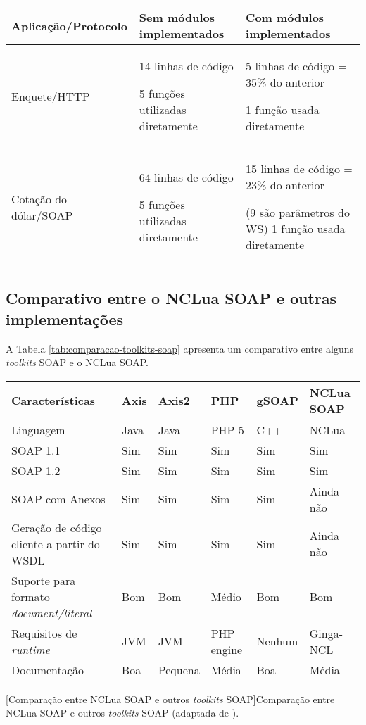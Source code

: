\begin{center}
\scriptsize{
	\begin{tabular}{|p{3cm}|p{4cm}|p{6cm}|} %
  \hline
		\textbf{Aplicação/Protocolo} & \textbf{Sem módulos implementados} & \textbf{Com módulos implementados} \\
  \hline
		Enquete/HTTP & 14 linhas de código\par5 funções utilizadas diretamente & 
    5 linhas de código = 35\% do anterior\par1 função usada diretamente \\
  \hline
		Cotação do dólar/SOAP & 64 linhas de código\par5 funções utilizadas diretamente & 
    15 linhas de código = 23\% do anterior
    \par(9 são parâmetros do WS) 1 função usada diretamente \\
  \hline
	\end{tabular}
	\label{tab:comparativo-propostas}
}
\end{center}

\subsection{Comparativo entre o NCLua SOAP e outras implementações}

A Tabela \ref{tab:comparacao-toolkits-soap} apresenta um comparativo entre alguns \textit{toolkits} SOAP
e o NCLua SOAP.

\begin{center}
\scriptsize{
	\begin{tabular}{|p{5.5cm}|p{1cm}|p{1cm}|p{1.5cm}|p{1.2cm}|p{2cm}|} %
  \hline
		\textbf{Características} & 
		\textbf{Axis} &
		\textbf{Axis2} &		
		\textbf{PHP} &		
		\textbf{gSOAP} &		
		\textbf{NCLua SOAP} 
    \\
  \hline
		Linguagem & Java & Java & PHP 5 & C++ & NCLua \\  
  \hline
		SOAP 1.1 & Sim & Sim & Sim & Sim & Sim \\  
  \hline
		SOAP 1.2 & Sim & Sim & Sim & Sim & Sim \\  
  \hline
		SOAP com Anexos & Sim & Sim & Sim & Sim & Ainda não \\  
  \hline
		Geração de código cliente a partir do WSDL & Sim & Sim & Sim & Sim & Ainda não \\  
  \hline
		Suporte para formato \textit{document/literal} & Bom & Bom & Médio & Bom & Bom \\  
  \hline
		Requisitos de \textit{runtime} & JVM & JVM & PHP engine & Nenhum & Ginga-NCL \\  
  \hline
		Documentação & Boa & Pequena & Média & Boa & Média \\  		
	\hline
	\end{tabular}
	[Comparação entre NCLua SOAP e outros \textit{toolkits} SOAP]{Comparação entre NCLua SOAP e outros \textit{toolkits} SOAP (adaptada de \cite{louridas2006soap}).}
	\label{tab:comparacao-toolkits-soap}
}
\end{center}


